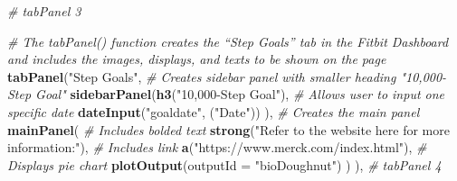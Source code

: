 \documentclass[]{book}
\newenvironment{Shaded}{\begin{snugshade}}{\end{snugshade}}
\newcommand{\CommentTok}[1]{\textcolor[rgb]{0.56,0.35,0.01}{\textit{#1}}}
\newcommand{\DataTypeTok}[1]{\textcolor[rgb]{0.13,0.29,0.53}{#1}}
\newcommand{\KeywordTok}[1]{\textcolor[rgb]{0.13,0.29,0.53}{\textbf{#1}}}
\newcommand{\NormalTok}[1]{#1}
\newcommand{\StringTok}[1]{\textcolor[rgb]{0.31,0.60,0.02}{#1}}
\begin{document}
\begin{Shaded}
\begin{Highlighting}[]
{{             \CommentTok{# tabPanel 3}
             
             \CommentTok{# The tabPanel() function creates the “Step Goals” tab in the Fitbit Dashboard and includes the images, displays, and texts to be shown on the page}
             \KeywordTok{tabPanel}\NormalTok{(}\StringTok{"Step Goals"}\NormalTok{,}
                      \CommentTok{# Creates sidebar panel with smaller heading "10,000-Step Goal"}
                      \KeywordTok{sidebarPanel}\NormalTok{(}\KeywordTok{h3}\NormalTok{(}\StringTok{"10,000-Step Goal"}\NormalTok{),}
                                   \CommentTok{# Allows user to input one specific date}
                                   \KeywordTok{dateInput}\NormalTok{(}\StringTok{"goaldate"}\NormalTok{, (}\StringTok{"Date"}\NormalTok{))}
\NormalTok{                      ),}
                      \CommentTok{# Creates the main panel}
                      \KeywordTok{mainPanel}\NormalTok{(}
                        \CommentTok{# Includes bolded text}
                        \KeywordTok{strong}\NormalTok{(}\StringTok{"Refer to the website here for more information:"}\NormalTok{),}
                        \CommentTok{# Includes link}
                        \KeywordTok{a}\NormalTok{(}\StringTok{"https://www.merck.com/index.html"}\NormalTok{),}
                        \CommentTok{# Displays pie chart}
                        \KeywordTok{plotOutput}\NormalTok{(}\DataTypeTok{outputId =} \StringTok{"bioDoughnut"}\NormalTok{)}
\NormalTok{                      )}
\NormalTok{             ),}
             \CommentTok{# tabPanel 4}
             
}}
\end{Highlighting}
\end{Shaded}
\end{document}
